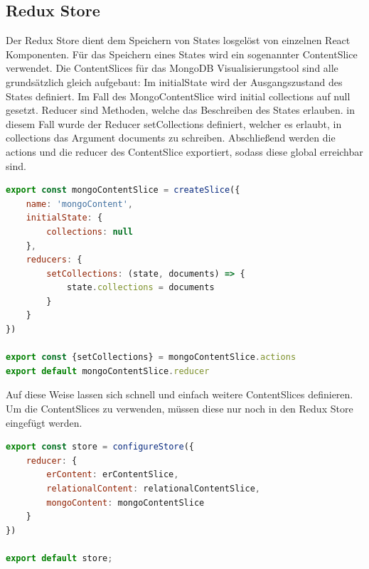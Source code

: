 \subsection{Redux Store}
\label{sub:fe_redux}

Der Redux Store dient dem Speichern von States losgelöst von einzelnen React Komponenten.
Für das Speichern eines States wird ein sogenannter ContentSlice verwendet.
Die ContentSlices für das MongoDB Visualisierungstool sind alle grundsätzlich gleich aufgebaut:
Im initialState wird der Ausgangszustand des States definiert. 
Im Fall des MongoContentSlice wird initial collections auf null gesetzt.
Reducer sind Methoden, welche das Beschreiben des States erlauben.
in diesem Fall wurde der Reducer setCollections definiert, welcher es erlaubt, in collections das Argument documents zu schreiben.
Abschließend werden die actions und die reducer des ContentSlice exportiert, sodass diese global erreichbar sind.

\begin{lstlisting}[language=JavaScript, caption={MongoContentSlice},label={lst:fe_redux_slice}]
export const mongoContentSlice = createSlice({
    name: 'mongoContent',
    initialState: {
        collections: null
    },
    reducers: {
        setCollections: (state, documents) => {
            state.collections = documents
        }
    }
})

export const {setCollections} = mongoContentSlice.actions
export default mongoContentSlice.reducer
\end{lstlisting}

Auf diese Weise lassen sich schnell und einfach weitere ContentSlices definieren.
Um die ContentSlices zu verwenden, müssen diese nur noch in den Redux Store eingefügt werden.

\begin{lstlisting}[language=JavaScript, caption={Redux Store},label={lst:fe_redux_store}]
export const store = configureStore({
    reducer: {
        erContent: erContentSlice,
        relationalContent: relationalContentSlice,
        mongoContent: mongoContentSlice
    }
})

export default store;
\end{lstlisting}
